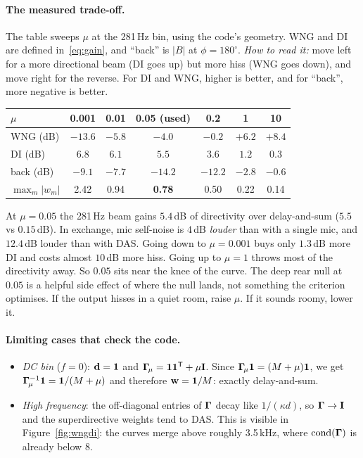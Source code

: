 \documentclass[11pt]{article}
\begin{document}
\paragraph{The measured trade-off.} The table sweeps $\mu$ at the 281\,Hz bin, using the
code's geometry. WNG and DI are defined in~\eqref{eq:gain}, and ``back'' is $|B|$ at
$\phi=180^\circ$. \emph{How to read it:} move left for a more directional beam (DI goes up) but
more hiss (WNG goes down), and move right for the reverse. For DI and WNG, higher is better, and
for ``back'', more negative is better.

\begin{center}\small
\begin{tabular}{@{}lcccccc@{}}
\toprule
$\mu$ & 0.001 & 0.01 & \textbf{0.05 (used)} & 0.2 & 1 & 10\\
\midrule
WNG (dB) & $-13.6$ & $-5.8$ & $\mathbf{-4.0}$ & $-0.2$ & $+6.2$ & $+8.4$\\
DI (dB)  & $6.8$ & $6.1$ & $\mathbf{5.5}$ & $3.6$ & $1.2$ & $0.3$\\
back (dB) & $-9.1$ & $-7.7$ & $\mathbf{-14.2}$ & $-12.2$ & $-2.8$ & $-0.6$\\
$\max_m|w_m|$ & 2.42 & 0.94 & \textbf{0.78} & 0.50 & 0.22 & 0.14\\
\bottomrule
\end{tabular}
\end{center}

\begin{rationale}[: \texttt{DIAGONAL\_LOADING = 0.05}]
At $\mu=0.05$ the 281\,Hz beam gains $5.4$\,dB of directivity over delay-and-sum ($5.5$ vs
$0.15$\,dB). In exchange, mic self-noise is $4$\,dB \emph{louder} than with a single mic, and
$12.4$\,dB louder than with DAS. Going down to $\mu=0.001$ buys only $1.3$\,dB more DI and costs
almost $10$\,dB more hiss. Going up to $\mu=1$ throws most of the directivity away. So $0.05$
sits near the knee of the curve. The deep rear null at $0.05$ is a helpful side effect of
where the null lands, not something the criterion optimises. If the output hisses in a quiet
room, raise $\mu$. If it sounds roomy, lower it.
\end{rationale}

\paragraph{Limiting cases that check the code.}
\begin{itemize}
\item \emph{DC bin} ($f=0$): $\mathbf{d}=\mathbf{1}$ and $\bm{\Gamma}_{\!\mu}=\mathbf{1}\mathbf{1}^{\mathsf T}+\mu\mathbf{I}$. Since
  $\bm{\Gamma}_{\!\mu}\mathbf{1}=(M+\mu)\mathbf{1}$, we get $\bm{\Gamma}_{\!\mu}^{-1}\mathbf{1}=\mathbf{1}/(M+\mu)$ and therefore $\mathbf{w}=\mathbf{1}/M$:
  exactly delay-and-sum.
\item \emph{High frequency}: the off-diagonal entries of $\bm{\Gamma}$ decay like $1/(\kappa d)$, so
  $\bm{\Gamma}\to\mathbf{I}$ and the superdirective weights tend to DAS. This is visible in
  Figure~\ref{fig:wngdi}: the curves merge above roughly 3.5\,kHz, where
  $\operatorname{cond}(\bm{\Gamma})$ is already below 8.
\end{itemize}
\end{document}
